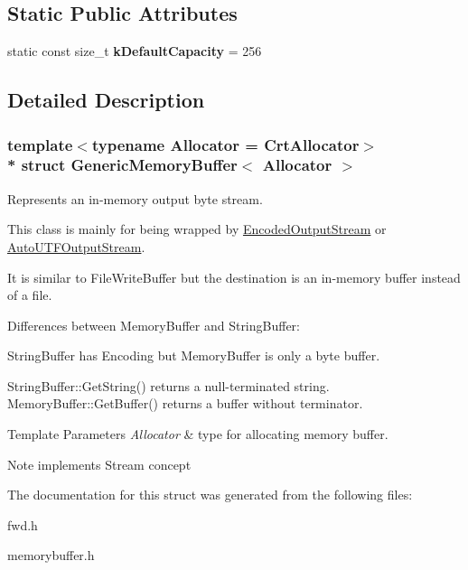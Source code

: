 \subsection*{Static Public Attributes}
\begin{DoxyCompactItemize}
\item 
static const size\+\_\+t {\bfseries k\+Default\+Capacity} = 256\hypertarget{a00119_af6ecdbdbb8d3aa53cdef6e788e4980be}{}\label{a00119_af6ecdbdbb8d3aa53cdef6e788e4980be}

\end{DoxyCompactItemize}


\subsection{Detailed Description}
\subsubsection*{template$<$typename Allocator = Crt\+Allocator$>$\\*
struct Generic\+Memory\+Buffer$<$ Allocator $>$}

Represents an in-\/memory output byte stream. 

This class is mainly for being wrapped by \hyperlink{a00094}{Encoded\+Output\+Stream} or \hyperlink{a00042}{Auto\+U\+T\+F\+Output\+Stream}.

It is similar to File\+Write\+Buffer but the destination is an in-\/memory buffer instead of a file.

Differences between Memory\+Buffer and String\+Buffer\+:
\begin{DoxyEnumerate}
\item String\+Buffer has Encoding but Memory\+Buffer is only a byte buffer.
\item String\+Buffer\+::\+Get\+String() returns a null-\/terminated string. Memory\+Buffer\+::\+Get\+Buffer() returns a buffer without terminator.
\end{DoxyEnumerate}


\begin{DoxyTemplParams}{Template Parameters}
{\em Allocator} & type for allocating memory buffer. \\
\hline
\end{DoxyTemplParams}
\begin{DoxyNote}{Note}
implements Stream concept 
\end{DoxyNote}


The documentation for this struct was generated from the following files\+:\begin{DoxyCompactItemize}
\item 
fwd.\+h\item 
memorybuffer.\+h\end{DoxyCompactItemize}

